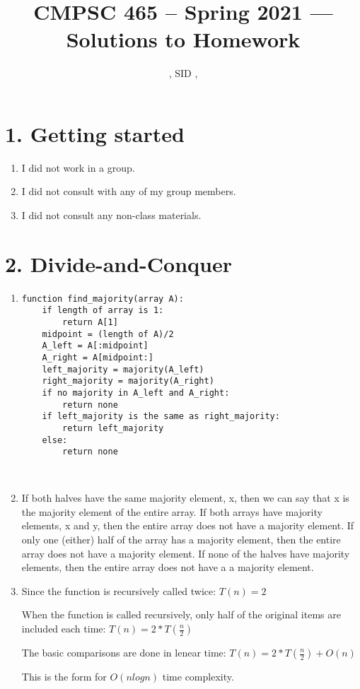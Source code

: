 \documentclass[11pt]{article}
\title{CMPSC 465 -- Spring 2021 --- Solutions to Homework \Homework}
\author{\Name, SID \SID, \texttt{\Login}}
\newenvironment{qparts}{\begin{enumerate}[{(}a{)}]}{\end{enumerate}}
\begin{document}
\maketitle

\section*{1. Getting started}
\begin{qparts}
\item
I did not work in a group.
\item
I did not consult with any of my group members.
\item
I did not consult any non-class materials.
\end{qparts}


\newpage
\section*{2. Divide-and-Conquer}
\begin{qparts}
\item
\begin{lstlisting}
function find_majority(array A):
	if length of array is 1:
		return A[1]
	midpoint = (length of A)/2
	A_left = A[:midpoint]
	A_right	= A[midpoint:]
	left_majority = majority(A_left)
	right_majority = majority(A_right)
	if no majority in A_left and A_right:
		return none
	if left_majority is the same as right_majority:
		return left_majority
	else:
		return none



\end{lstlisting}

\item

If both halves have the same majority element, x, then we can say that x is the majority element of the entire array. If both arrays have majority elements, x and y, then the entire array does not have a majority element. If only one (either) half of the array has a majority element, then the entire array does not have a majority element. If none of the halves have majority elements, then the entire array does not have a a majority element. 

\item

Since the function is recursively called twice: $T(n) = 2$

When the function is called recursively, only half of the original items are included each time: $T(n) = 2*T(\frac{n}{2})$

The basic comparisons are done in lenear time: $T(n) = 2*T(\frac{n}{2}) + O(n)$

This is the form for $O(nlogn)$ time complexity.



\end{qparts}
\end{document}
